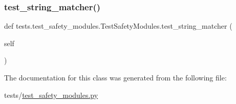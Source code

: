 \subsubsection{\texorpdfstring{test\+\_\+string\+\_\+matcher()}{test\_string\_matcher()}}
{\footnotesize\ttfamily def tests.\+test\+\_\+safety\+\_\+modules.\+Test\+Safety\+Modules.\+test\+\_\+string\+\_\+matcher (\begin{DoxyParamCaption}\item[{}]{self }\end{DoxyParamCaption})}



The documentation for this class was generated from the following file\+:\begin{DoxyCompactItemize}
\item 
tests/\hyperlink{test__safety__modules_8py}{test\+\_\+safety\+\_\+modules.\+py}\end{DoxyCompactItemize}
